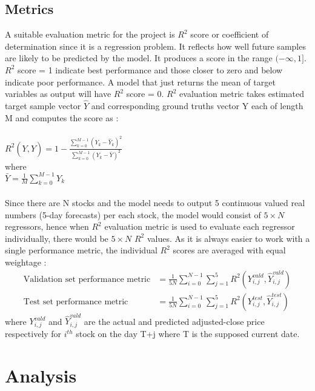 \documentclass[10pt]{report}
\begin{document}
\subsection*{Metrics}
A suitable evaluation metric for the project is $R^2$ score or coefficient of determination\cite{r2score} since it is a regression problem. It reflects how well future samples are likely to be predicted by the
model. It produces a score in the range $(-\infty, 1]$. $R^2$ score = 1 indicate best performance and those closer to zero and below indicate poor performance. A model that just returns the mean of target variables as output will have $R^2$ score = 0. $R^2$ evaluation metric takes estimated target sample vector $\hat{Y}$ and corresponding ground truths vector Y each of length M and computes the score as :\\
\\
$R^2\left(Y, \hat{Y}\right) = 1 - \frac{\displaystyle\sum_{k=0}^{M-1} \left(Y_k - \hat{Y}_k\right)^2}{\displaystyle\sum_{k=0}^{M-1} \left(Y_k - \bar{Y}\right)^2}$\\
where\\
$\bar{Y} = \frac{1}{M} \displaystyle\sum_{k=0}^{M-1} Y_k$
\\
\\
Since there are N stocks and the model needs to output 5 continuous valued real numbers (5-day forecasts) per each stock, the model would consist of $5 \times N$ regressors, hence when $R^2$ evaluation metric is used to evaluate each regressor individually, there would be $5 \times N$ $R^2$ values. As it is always easier to work with a single performance metric, the individual $R^2$ scores are averaged with equal weightage :\\
\begin{align*}
\text{Validation set performance metric} &= \frac{1}{5N} \displaystyle\sum_{i=0}^{N-1} \displaystyle\sum_{j=1}^{5} R^2\left(Y_{i,j}^{vald}, \hat{Y}_{i,j}^{vald}\right)\\
\text{Test set performance metric} &= \frac{1}{5N} \displaystyle\sum_{i=0}^{N-1} \displaystyle\sum_{j=1}^{5} R^2\left(Y_{i,j}^{test}, \hat{Y}_{i,j}^{test}\right)
\end{align*}
where $Y_{i,j}^{vald}$ and $\hat{Y}_{i,j}^{vald}$ are the actual and predicted adjusted-close price respectively for $i^{th}$ stock on the day T+j where T is the supposed current date.

\section{Analysis}
\end{document}
